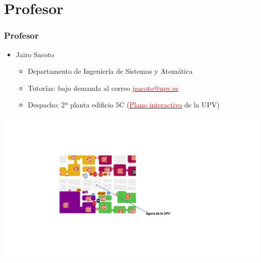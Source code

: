\section{Profesor}

\begin{frame}[fragile, label = profesorado]
\frametitle{Profesor}
\begin{itemize}
    \item Jairo Sacoto
    \begin{itemize}
        \item Departamento de Ingeniería de Sistemas y Atomática
        \item{Tutorías: bajo demanda al correo \href{mailto:jsacoto@isa.upv.es}{\textcolor{red}{jsacoto@upv.es}}}
        \item Despacho: 2ª planta edificio 5C (\href{http://www.upv.es/plano/plano-2d-es.html?entidad=ACOM}{\textcolor{red}{Plano interactivo}} de la UPV)
    \end{itemize}
\end{itemize}


\includegraphics[trim=5cm 0cm 5cm 5cm, clip, width=1.2\textwidth]{PlanoUPV}

\end{frame}
